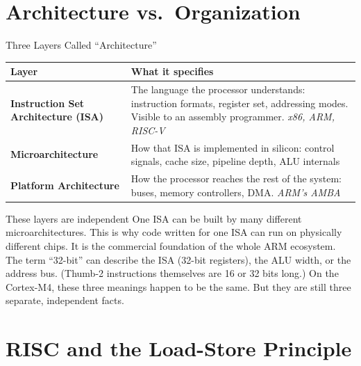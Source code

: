 \documentclass[9pt,aspectratio=169,xcolor=table]{beamer}
\begin{document}
\section{Architecture vs.\ Organization}

\begin{frame}{Three Layers Called ``Architecture''}
    \leavevmode
    \begin{center}
    {\small
    \striped
    \begin{tabular}{@{}l R{.58\textwidth}@{}}
        \toprule
        \textbf{Layer} & \textbf{What it specifies} \\
        \midrule
        \textbf{Instruction Set Architecture (ISA)}
            & The language the processor understands: instruction formats,
              register set, addressing modes. Visible to an assembly programmer.
              \emph{x86, ARM, RISC-V} \\[2mm]
        \textbf{Microarchitecture}
            & How that ISA is implemented in silicon: control signals, cache
              size, pipeline depth, ALU internals \\[2mm]
        \textbf{Platform Architecture}
            & How the processor reaches the rest of the system: buses, memory controllers,
              DMA. \emph{ARM's AMBA} \\
        \bottomrule
    \end{tabular}}
    \end{center}
    \vspace{2mm}
    \begin{block}{These layers are independent}
        One ISA can be built by many different microarchitectures. This is why code written for one ISA can run on physically different chips. It is the commercial foundation of the whole ARM ecosystem.
        \vspace{1mm}
        The term ``32-bit'' can describe the ISA (32-bit registers), the ALU width, or the address bus. (Thumb-2 instructions themselves are 16 or 32 bits long.) On the Cortex-M4, these three meanings happen to be the same. But they are still three separate, independent facts.
    \end{block}
\end{frame}


\section{RISC and the Load-Store Principle}
\end{document}
